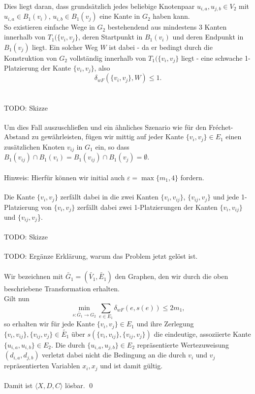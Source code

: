 \documentclass[a4paper, 12pt, twoside]{article}
\theoremstyle{Format1} %
\begin{document}
Dies liegt daran, dass grundsätzlich jedes beliebige Knotenpaar $u_{i,a}, u_{j,b} \in V_2$ mit $u_{i,a} \in B_1(v_i)$, $u_{i,b} \in B_1(v_j)$ eine Kante in $G_2$ haben kann.
\\
So existieren einfache Wege in $G_2$ bestehendend aus mindestens 3 Kanten innerhalb von $T_1(\{v_i, v_j\}$, deren Startpunkt in $B_1(v_i)$ und deren Endpunkt in $B_1(v_j)$ liegt.
Ein solcher Weg $W$ ist dabei - da er bedingt durch die Konstruktion von $G_2$ vollständig innerhalb von $T_1(\{v_i, v_j\}$ liegt - eine schwache 1-Platzierung der Kante $\{v_i, v_j\}$, also
$$ \delta_{wF}(\{v_i, v_j\}, W) \leq 1.$$
\\
\\
TODO: Skizze
\\
\\
Um dies Fall auszuschließen und ein ähnliches Szenario wie für den Fréchet-Abstand zu gewährleisten, fügen wir mittig auf jeder Kante $\{v_i, v_j\} \in E_1$
einen zusätzlichen Knoten $v_{ij}$ in $G_1$ ein, so dass $B_1(v_{ij}) \cap B_1(v_i) = B_1(v_{ij}) \cap B_1(v_j) = \emptyset$.
\\
\\
Hinweis: Hierfür können wir initial auch $\varepsilon = \max \{m_1, 4\}$ fordern.
\\
\\
Die Kante $\{v_i, v_j\}$ zerfällt dabei in die zwei Kanten $\{v_i, v_{ij}\}$, $\{v_{ij},v_j\}$ und
jede 1-Platzierung von $\{v_i, v_j\}$ zerfällt dabei zwei 1-Platzierungen der Kanten $\{v_i, v_{ij}\}$ und $\{v_{ij}, v_j$\}.
\\
\\
TODO: Skizze
\\
\\
TODO: Ergänze Erklärung, warum das Problem jetzt gelöst ist.
\\
\\
Wir bezeichnen mit $\tilde{G_1}=(\tilde{V_1}, \tilde{E_1})$ den Graphen, den wir durch die oben beschriebene Transformation erhalten.
\\
Gilt nun
$$ \min_{s: \tilde{G_1} \to G_2} \sum_{e \in E_1} \delta_{wF}(e, s(e)) \leq 2m_1, $$
so erhalten wir für jede Kante $\{v_i, v_j\} \in E_1$ und ihre Zerlegung $\{v_i, v_{ij}\},\{v_{ij}, v_j\} \in \tilde{E_1}$
über $s(\{v_i, v_{ij}\},\{v_{ij}, v_j\})$ die eindeutige, assoziierte Kante $\{u_{i,a}, u_{i,b}\} \in E_2$.
Die durch $\{u_{i,a}, u_{j,b}\} \in E_2$ repräsentierte Wertezuweisung $(d_{i,a}, d_{j,b})$ verletzt dabei nicht die Bedingung an die
durch $v_i$ und $v_j$ repräsentierten Variablen $x_i, x_j$ und ist damit gültig.
\\
\\
Damit ist $\langle X,D,C \rangle$ lösbar. \qed
\\
\\
\end{document}
